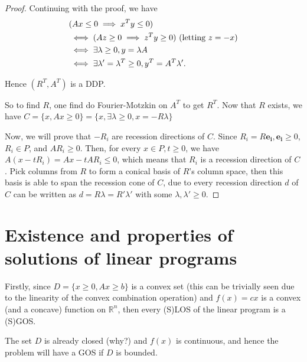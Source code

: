 \begin{proof}
Continuing with the proof, we have
\begin{align*}
  &(Ax \le 0 \implies x^{T}y \le 0)\\
  &\iff(Az \ge  0 \implies z^{T}y \ge  0) \text{ (letting \( z = -x \))}\\
  &\iff \exists \lambda \ge 0,  y = \lambda A\\
  &\iff \exists  \lambda' = \lambda^{T} \ge 0, y^{T} = A^{T}\lambda'
.\end{align*}

Hence \( (R^{T}, A^{T}) \) is a DDP.

So to find \( R \), one find do Fourier-Motzkin on \( A^{T} \) to get \( R^{T}
\). Now that \( R \) exists, we have \( C = \{x, Ax \ge 0\} = \{x, \exists
\lambda \ge 0, x = -R\lambda\}  \)

Now, we will prove that \( -R_{i} \) are recession directions of \( C \).
Since \( R_{i} = R\mathbf{e_{i}}, \mathbf{e_{i}} \ge 0 \), \( R_{i} \in P \),
and \( AR_{i} \ge  0 \). Then, for every \( x \in P, t \ge 0 \), we have \( A(x
- tR_{i}) = Ax - tAR_{i} \le  0 \), which means that \( R_{i} \) is a recession
direction of \( C \). Pick columns from \( R \) to form a conical basis of \( R \)'s
column space, then this basis is able to span the recession cone of \( C \), due
to every recession direction \( d \) of \( C \) can be written as \( d =
R\lambda = R'\lambda' \) with some \( \lambda, \lambda' \ge  0 \).
\end{proof}



\section{Existence and properties of solutions of linear programs} %
\label{sec:Existence and properties of solutions of linear programs}

Firstly, since \( D = \{x\ge 0, Ax \ge  b\}   \) is a convex set (this can be
trivially seen due to the linearity of the convex combination operation) and \(
f(x)=cx\) is a convex (and a concave) function on \( \mathbb{R}^{n} \), then
every (S)LOS of the linear program is a (S)GOS.

The set \( D \) is already closed (why?) and \( f(x) \) is continuous, and hence
the problem will have a GOS if \( D \) is bounded.

